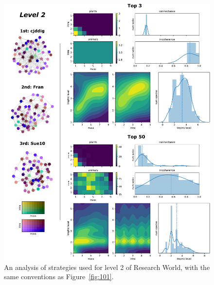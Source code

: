 \begin{figure}
  \centering
  \includegraphics[height=.85\textheight, right]{joy/102.pdf}
  \caption[Results from Research World level 2]{An analysis of strategies used for level 2 of Research World, with the same conventions as Figure~\ref{fig:101}.}
  \label{fig:102}
\end{figure}
